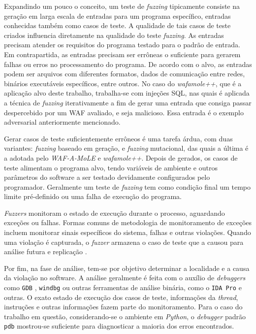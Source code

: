 Expandindo um pouco o conceito, um teste de \textit{fuzzing} tipicamente consiste na geração em larga escala de entradas para um programa específico, entradas conhecidas também como casos de teste. A qualidade de tais casos de teste criados influencia diretamente na qualidade do teste \textit{fuzzing}. As entradas precisam atender os requisitos do programa testado para o padrão de entrada. Em contrapartida, as entradas precisam ser errôneas o suficiente para gerarem falhas ou erros no processamento do programa. De acordo com o alvo, as entradas podem ser arquivos com diferentes formatos, dados de comunicação entre redes, binários executáveis específicos, entre outros. No caso do \textit{wafamole++}, que é a aplicação alvo deste trabalho, trabalha-se com injeções SQL, nas quais é aplicada a técnica de \textit{fuzzing} iterativamente a fim de gerar uma entrada que consiga passar despercebido por um WAF avaliado, e seja malicioso. Essa entrada é o exemplo adversarial anteriormente mencionado.

Gerar casos de teste suficientemente errôneos é uma tarefa árdua, com duas variantes: \textit{fuzzing} baseado em geração, e \textit{fuzzing} mutacional, das quais a última é a adotada pelo \textit{WAF-A-MoLE} e \textit{wafamole++}. Depois de gerados, os casos de teste alimentam o programa alvo, tendo variáveis de ambiente e outros parâmetros do software a ser testado devidamente configurados pelo programador. Geralmente um teste de \textit{fuzzing} tem como condição final um tempo limite pré-definido ou uma falha de execução do programa.

\textit{Fuzzers} monitoram o estado de execução durante o processo, aguardando exceções ou falhas. Formas comuns de metodologia de monitoramento de exceções incluem monitorar sinais específicos do sistema, falhas e outras violações. Quando uma violação é capturada, o \textit{fuzzer} armazena o caso de teste que a causou para análise futura e replicação \cite{li2018fuzzing}.

Por fim, na fase de análise, tem-se por objetivo determinar a localidade e a causa da violação no software. A análise geralmente é feita com o auxílio de \textit{debuggers} como \verb+GDB+ \cite{gdb_docs}, \verb+windbg+ \cite{windbg_docs} ou outras ferramentas de análise binária, como o \verb+IDA Pro+ \cite{ida_pro_docs} e outras. O exato estado de execução dos casos de teste, informações da \textit{thread}, instruções e outras informações fazem parte do monitoramento. Para o caso do trabalho em questão, considerando-se o ambiente em \textit{Python}, o \textit{debugger} padrão \verb+pdb+ mostrou-se suficiente para diagnosticar a maioria dos erros encontrados. 

